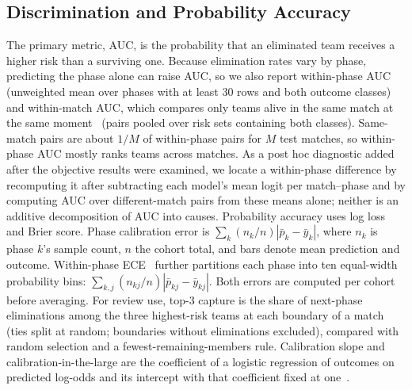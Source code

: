 \documentclass[sigconf,anonymous,nonacm]{acmart}
\begin{document}
\subsection{Discrimination and Probability Accuracy}
The primary metric, AUC, is the probability that an eliminated team receives a higher risk than a surviving one.
Because elimination rates vary by phase, predicting the phase alone can raise AUC, so we also report within-phase AUC (unweighted mean over phases with at least 30 rows and both outcome classes) and within-match AUC, which compares only teams alive in the same match at the same moment~\cite{HeagertyZheng05} (pairs pooled over risk sets containing both classes).
Same-match pairs are about $1/M$ of within-phase pairs for $M$ test matches, so within-phase AUC mostly ranks teams across matches. As a post hoc diagnostic added after the objective results were examined, we locate a within-phase difference by recomputing it after subtracting each model's mean logit per match--phase and by computing AUC over different-match pairs from these means alone; neither is an additive decomposition of AUC into causes. Probability accuracy uses log loss and Brier score. Phase calibration error is $\sum_k(n_k/n)|\bar p_k-\bar y_k|$, where $n_k$ is phase $k$'s sample count, $n$ the cohort total, and bars denote mean prediction and outcome. Within-phase ECE~\cite{Naeini15} further partitions each phase into ten equal-width probability bins: $\sum_{k,j}(n_{kj}/n)|\bar p_{kj}-\bar y_{kj}|$. Both errors are computed per cohort before averaging. For review use, top-3 capture is the share of next-phase eliminations among the three highest-risk teams at each boundary of a match (ties split at random; boundaries without eliminations excluded), compared with random selection and a fewest-remaining-members rule. Calibration slope and calibration-in-the-large are the coefficient of a logistic regression of outcomes on predicted log-odds and its intercept with that coefficient fixed at one~\cite{VanCalster16}.
\end{document}

